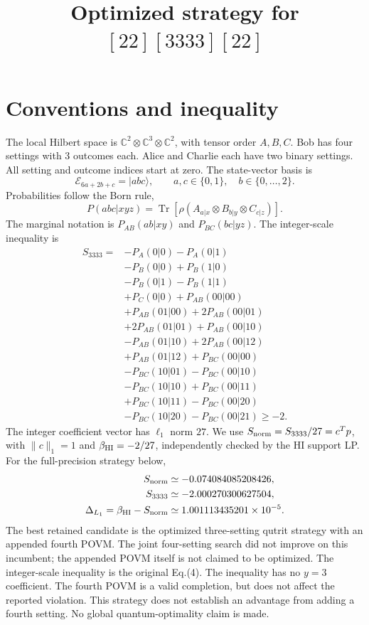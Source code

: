 \documentclass[11pt]{article}
\title{Optimized strategy for $[22][3333][22]$}
\author{}
\date{}
\begin{document}
\maketitle
\section{Conventions and inequality}
\label{app:3333_strategy}
The local Hilbert space is $\mathbb C^2\otimes\mathbb C^3\otimes\mathbb C^2$,
with tensor order $A,B,C$. Bob has four settings with 3 outcomes each.
Alice and Charlie each have two binary settings. All setting and outcome
indices start at zero. The state-vector basis is
\[
\mathcal E_{6a+2b+c}=|abc\rangle,\qquad a,c\in\{0,1\},\quad b\in\{0,\ldots,2\}.
\]
Probabilities follow the Born rule,
\[
P(abc|xyz)=\operatorname{Tr}\!\left[\rho
 (A_{a|x}\otimes B_{b|y}\otimes C_{c|z})\right].
\]
The marginal notation is $P_{AB}(ab|xy)$ and $P_{BC}(bc|yz)$.
The integer-scale inequality is
\begin{equation}
\begin{aligned}
S_{3333}={}&-P_{A}(0|0)-P_{A}(0|1)\\
&-P_{B}(0|0)+P_{B}(1|0)\\
&-P_{B}(0|1)-P_{B}(1|1)\\
&+P_{C}(0|0)+P_{AB}(00|00)\\
&+P_{AB}(01|00)+2P_{AB}(00|01)\\
&+2P_{AB}(01|01)+P_{AB}(00|10)\\
&-P_{AB}(01|10)+2P_{AB}(00|12)\\
&+P_{AB}(01|12)+P_{BC}(00|00)\\
&-P_{BC}(10|01)-P_{BC}(00|10)\\
&-P_{BC}(10|10)+P_{BC}(00|11)\\
&+P_{BC}(10|11)-P_{BC}(00|20)\\
&-P_{BC}(10|20)-P_{BC}(00|21)\geq -2.
\end{aligned}
\end{equation}
The integer coefficient vector has $\ell_1$ norm $27$. We use
$S_{\rm norm}=S_{3333}/27=c^Tp$, with $\|c\|_1=1$ and
$\beta_{\rm HI}=-2/27$, independently checked by the HI support LP.
For the full-precision strategy below,
\[
\begin{aligned}
S_{\rm norm}&\simeq -0.074084085208426,\\
S_{3333}&\simeq -2.000270300627504,\\
\Delta_{L_1}=\beta_{\rm HI}-S_{\rm norm}&\simeq 1.001113435201\times10^{-5}.
\end{aligned}
\]
The best retained candidate is the optimized three-setting qutrit strategy
with an appended fourth POVM. The joint four-setting search did not improve
on this incumbent; the appended POVM itself is not claimed to be optimized.
The integer-scale inequality is the original Eq.(4).
The inequality has no $y=3$ coefficient. The fourth POVM is a valid
completion, but does not affect the reported violation. This strategy does
not establish an advantage from adding a fourth setting. No global
quantum-optimality claim is made.
\end{document}
